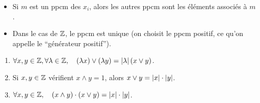 \documentclass[12pt, a4paper]{report}
\begin{document}
\begin{remark}
    \begin{itemize}
        \item Si $m$ est un ppcm des $x_i$, alors les autres ppcm sont les éléments associés à $m$.

        \item Dans le cas de $\mathbb{Z}$, le ppcm est unique (on choisit le ppcm positif, ce qu'on appelle le ``générateur positif'').
    \end{itemize}
\end{remark}

\begin{property}
    \begin{enumerate}
        \item $\forall x,y \in \mathbb{Z}, \forall \lambda \in \mathbb{Z}, \quad (\lambda x) \vee (\lambda y) = \left|\lambda\right| (x \vee y)$.
        \item Si $x,y \in \mathbb{Z}$ vérifient $x \wedge y = 1$, alors $x \vee y = \left|x\right|\cdot\left|y\right|$.
        \item $\forall x,y\in\mathbb{Z}, \quad (x \wedge y) \cdot (x \vee y) = \left|x\right|\cdot\left|y\right|$.
    \end{enumerate}
\end{property}
\end{document}
